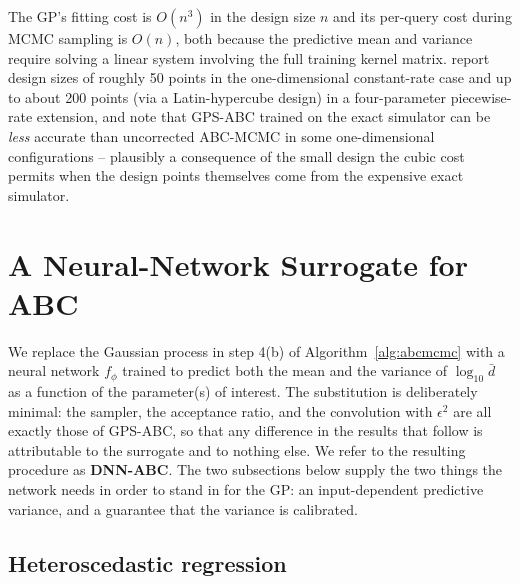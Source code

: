 \documentclass[sn-basic,iicol,pdflatex]{sn-jnl}
\newcommand{\dbar}{\ensuremath{\bar d}}
\begin{document}
The GP's fitting cost is $O(n^3)$ in the design size $n$ and its per-query
cost during MCMC sampling is $O(n)$, both because the predictive mean and
variance require solving a linear system involving the full training kernel
matrix. \citet{lu2023} report design sizes of roughly 50 points in the
one-dimensional constant-rate case and up to about 200 points (via a
Latin-hypercube design) in a four-parameter piecewise-rate extension, and note
that GPS-ABC trained on the exact simulator can be \emph{less} accurate than
uncorrected ABC-MCMC in some one-dimensional configurations -- plausibly a
consequence of the small design the cubic cost permits when the design points
themselves come from the expensive exact simulator.

\section{A Neural-Network Surrogate for ABC}
\label{sec:method}

We replace the Gaussian process in step 4(b) of Algorithm~\ref{alg:abcmcmc}
with a neural network $f_\phi$ trained to predict both the mean and the variance
of $\log_{10}\dbar$ as a function of the parameter(s) of interest. The
substitution is deliberately minimal: the sampler, the acceptance ratio, and the
convolution with $\epsilon^2$ are all exactly those of GPS-ABC, so that any
difference in the results that follow is attributable to the surrogate and to
nothing else. We refer to the resulting procedure as \textbf{DNN-ABC}. The two
subsections below supply the two things the network needs in order to stand in
for the GP: an input-dependent predictive variance, and a guarantee that the
variance is calibrated.

\subsection{Heteroscedastic regression}
\label{sec:hetero}
\end{document}
